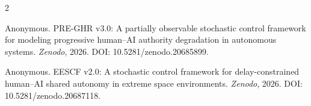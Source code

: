 \documentclass[conference]{IEEEtran}
\begin{document}
\begin{thebibliography}{2}

Anonymous.
PRE-GHR v3.0: A partially observable stochastic control framework for modeling progressive human--AI authority degradation in autonomous systems.
\emph{Zenodo}, 2026. DOI: 10.5281/zenodo.20685899.

Anonymous.
EESCF v2.0: A stochastic control framework for delay-constrained human--AI shared autonomy in extreme space environments.
\emph{Zenodo}, 2026. DOI: 10.5281/zenodo.20687118.

\end{thebibliography}
\end{document}
